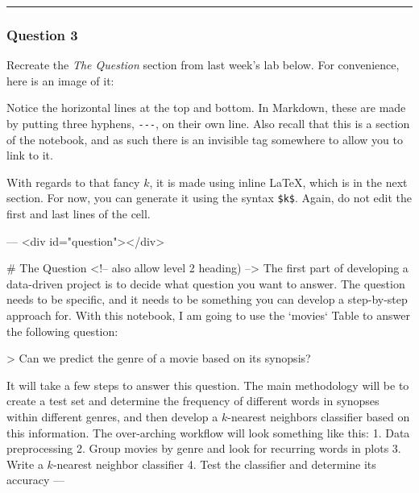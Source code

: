 \documentclass[11pt]{article}
\newenvironment{Shaded}{}{}
\newcommand{\DataTypeTok}[1]{\textcolor[rgb]{0.56,0.13,0.00}{{#1}}}
\newcommand{\BaseNTok}[1]{\textcolor[rgb]{0.25,0.63,0.44}{{#1}}}
\newcommand{\FloatTok}[1]{\textcolor[rgb]{0.25,0.63,0.44}{{#1}}}
\newcommand{\FunctionTok}[1]{\textcolor[rgb]{0.02,0.16,0.49}{{#1}}}
\newcommand{\NormalTok}[1]{{#1}}
\begin{document}
    \begin{center}\rule{0.5\linewidth}{\linethickness}\end{center}

\hypertarget{question-3}{%
\subsubsection{Question 3}\label{question-3}}

Recreate the \emph{The Question} section from last week's lab below. For
convenience, here is an image of it:

Notice the horizontal lines at the top and bottom. In Markdown, these
are made by putting three hyphens, \texttt{-\/-\/-}, on their own line.
Also recall that this is a section of the notebook, and as such there is
an invisible tag somewhere to allow you to link to it.

With regards to that fancy \(k\), it is made using inline LaTeX, which
is in the next section. For now, you can generate it using the syntax
\texttt{\$k\$}. Again, do not edit the first and last lines of the cell.

    \begin{Shaded}
\begin{Highlighting}[]
\NormalTok{---}
\NormalTok{<div id="question"></div>}

\FunctionTok{# The Question <!-- also allow level 2 heading) -->}
\NormalTok{The first part of developing a data-driven project is to decide what question you want to answer. The question needs to be specific, and it needs to be something you can develop a step-by-step approach for. With this notebook, I am going to use the }\BaseNTok{`movies`}\NormalTok{ Table to answer the following question:}

\NormalTok{>}\DataTypeTok{ Can we predict the genre of a movie based on its synopsis?}

\NormalTok{It will take a few steps to answer this question. The main methodology will be to create a test set and determine the frequency of different words in synopses within different genres, and then develop a $k$-nearest neighbors classifier based on this information. The over-arching workflow will look something like this:}
\NormalTok{1. }\FloatTok{Data preprocessing}
\FloatTok{2. Group movies by genre and look for recurring words in plots}
\FloatTok{3. Write a $k$-nearest neighbor classifier}
\FloatTok{4. Test the classifier and determine its accuracy}
\FloatTok{---}
\end{Highlighting}
\end{Shaded}
\end{document}
